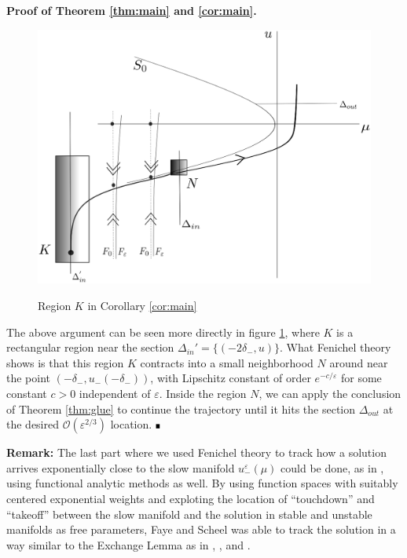 \documentclass[letterpaper,11pt]{article}
\newcommand{\rmO}{\mathcal{O}}
\newcommand{\eps}{\varepsilon}
\numberwithin{equation}{section}
\theoremstyle{plain}
\newenvironment{Proof}[1][.]%
 {\begin{trivlist}\item[]\textbf{Proof#1 }}%
 {\hspace*{\fill}$\rule{0.3\baselineskip}{0.35\baselineskip}$\end{trivlist}}
\begin{document}
\begin{Proof}[\textbf{ of Theorem \ref{thm:main} and \ref{cor:main}}.]
\begin{figure}[ht]
 \centering %
 \scalebox{0.6} %
 {\includegraphics[angle = 0, origin = c]{pictures/contraction_Fenichel.eps}} %
 \caption{Region $K$ in Corollary \ref{cor:main}}\label{fig:contraction_Fenichel} 
\end{figure}

The above argument can be seen more directly in figure \ref{fig:contraction_Fenichel}, where $K$ is a rectangular region near the section $\Delta_{in}'=\{(-2\delta_-,u)\}$. What Fenichel theory shows is that this region $K$ contracts into a small neighborhood $N$ around near the point $(-\delta_-, u_-(-\delta_-))$, with Lipschitz constant of order $e^{-c/\eps}$ for some constant $c>0$ independent of $\eps$. Inside the region $N$, we can apply the conclusion of Theorem \ref{thm:glue} to continue the trajectory until it hits the section $\Delta_{out}$ at the desired $\rmO(\eps^{2/3})$ location. 
\end{Proof}

\textbf{Remark:} The last part where we used Fenichel theory to track how a solution arrives exponentially close to the slow manifold $u_-^\eps(\mu)$ could be done, as in \cite{faye2015existence}, using functional analytic methods as well. By using function spaces with suitably centered exponential weights and exploting the location of ``touchdown'' and ``takeoff'' between the slow manifold and the solution in stable and unstable manifolds as free parameters, Faye and Scheel was able to track the solution in a way similar to the Exchange Lemma as in \cite{Bru_tracking}, \cite{Jones_tracking}, and \cite{Jones_exchange_lemma}.
\end{document}
